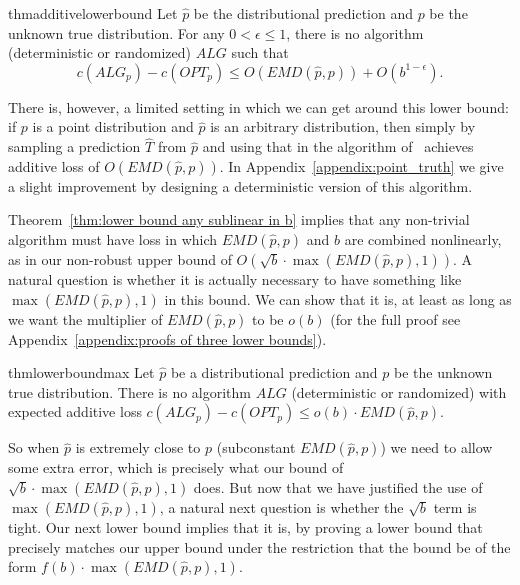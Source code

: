 \begin{restatable}{thm}{additivelowerbound}
    \label{thm:lower bound any sublinear in b}
    Let $\hat{p}$ be the distributional prediction and $p$ be the unknown true distribution. For any $0<\epsilon \leq 1$, there is no algorithm (deterministic or randomized) $ALG$ such that 
    \[c(ALG_p) - c(OPT_p) \leq O(EMD(\hat{p},p))+O(b^{1-\epsilon}).\]
\end{restatable}

There is, however, a limited setting in which we can get around this lower bound: if $p$ is a point distribution and $\hat p$ is an arbitrary distribution, then simply by sampling a prediction $\hat T$ from $\hat p$ and using that in the algorithm of~\citet{kumar2024improvingonlinealgorithmsml} achieves additive loss of $O(EMD(\hat p, p))$.  In Appendix~\ref{appendix:point_truth} we give a slight improvement by designing a deterministic version of this algorithm.

Theorem~\ref{thm:lower bound any sublinear in b} implies that any non-trivial algorithm must have loss in which $EMD(\hat p, p)$ and $b$ are combined nonlinearly, as in our non-robust upper bound of $O\left(\sqrt{b} \cdot \max(EMD(\hat p, p), 1)\right)$.  A natural question is whether it is actually necessary to have something like $\max(EMD(\hat p, p), 1)$ in this bound.  We can show that it is, at least as long as we want the multiplier of $EMD(\hat p, p)$ to be $o(b)$ (for the full proof see Appendix~\ref{appendix:proofs of three lower bounds}).  

\begin{restatable}{thm}{lowerboundmax} \label{thm:lower bound when EMD is in 1/b additive loss is at least Omega(1)}
    Let $\hat{p}$ be a distributional prediction and $p$ be the unknown true distribution.  There is no algorithm $ALG$ (deterministic or randomized) with expected additive loss $c(ALG_p) - c(OPT_p) \leq o(b) \cdot EMD(\hat p, p)$.   
\end{restatable}

So when $\hat p$ is extremely close to $p$ (subconstant $EMD(\hat p, p)$) we need to allow some extra error, which is precisely what our bound of $\sqrt{b} \cdot \max(EMD(\hat p, p), 1)$ does.  But now that we have justified the use of $\max(EMD(\hat p, p), 1)$, a natural next question is whether the $\sqrt{b}$ term is tight.  Our next lower bound implies that it is, by proving a lower bound that precisely matches our upper bound under the restriction that the bound be of the form $f(b) \cdot \max(EMD(\hat{p},p),1)$.   

